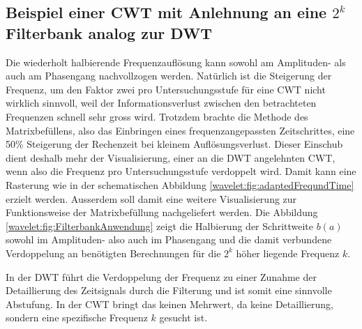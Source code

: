 
\subsection{Beispiel einer CWT mit Anlehnung an eine $2^k$ Filterbank analog zur DWT
	\label{wavelets:subsection:Radix2CWT}}
Die wiederholt halbierende Frequenzauflösung kann sowohl am Amplituden-
als auch am Phasengang nachvollzogen werden.
Natürlich ist die Steigerung der Frequenz, um den Faktor zwei pro
Untersuchungsstufe für eine CWT nicht wirklich sinnvoll, weil der
Informationsverlust zwischen den betrachteten Frequenzen schnell
sehr gross wird.
Trotzdem brachte die Methode des Matrixbefüllens, also das Einbringen
eines frequenzangepassten Zeitschrittes, eine 50\% Steigerung der
Rechenzeit bei kleinem Auflösungsverlust.
Dieser Einschub dient deshalb mehr der Visualisierung, einer an die
DWT angelehnten CWT, wenn also die Frequenz pro Untersuchungsstufe
verdoppelt wird.
Damit kann eine Rasterung wie in der schematischen Abbildung
\ref{wavelet:fig:adaptedFrequndTime} erzielt werden.
Ausserdem soll damit eine weitere Visualisierung zur Funktionsweise
der Matrixbefüllung nachgeliefert werden.
Die Abbildung \ref{wavelet:fig:FilterbankAnwendung} zeigt die
Halbierung der Schrittweite $b(a)$ sowohl im Amplituden- also auch
im Phasengang und die damit verbundene Verdoppelung an benötigten
Berechnungen für die $2^k$ höher liegende Frequenz $k$.

In der DWT führt die Verdoppelung der Frequenz zu einer Zunahme der
Detaillierung des Zeitsignals durch die Filterung und ist somit
eine sinnvolle Abstufung.
In der CWT bringt das keinen Mehrwert, da keine Detaillierung,
sondern eine spezifische Frequenz $k$ gesucht ist.
 

